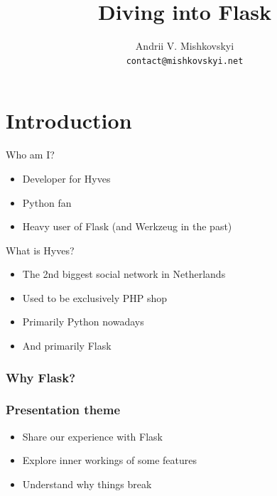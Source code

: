 \documentclass{beamer}
\title{Diving into Flask}
\author[A. Mishkovskyi]{Andrii V. Mishkovskyi \\ \texttt{contact@mishkovskyi.net}}
\date[EuroPython 2012]
\begin{document}
\lstset{
  language=Python,
  basicstyle=\ttfamily,
  columns=fixed,
  showspaces=false,
  showstringspaces=false,
}

\section{Introduction}


\begin{frame}{Who am I?}
  \begin{itemize}
  \item Developer for Hyves
  \item Python fan
  \item Heavy user of Flask (and Werkzeug in the past)
  \end{itemize}
\end{frame}

\begin{frame}{What is Hyves?}
  \begin{itemize}
  \item The 2nd biggest social network in Netherlands
  \item Used to be exclusively PHP shop
  \item Primarily Python nowadays
  \item And primarily Flask
  \end{itemize}
\end{frame}

\begin{frame}
  \frametitle{Why Flask?}
\end{frame}

\begin{frame}
  \frametitle{Presentation theme}
  \begin{itemize}
  \item Share our experience with Flask
  \item Explore inner workings of some features
  \item Understand why things break
  \end{itemize}
\end{frame}
\end{document}
